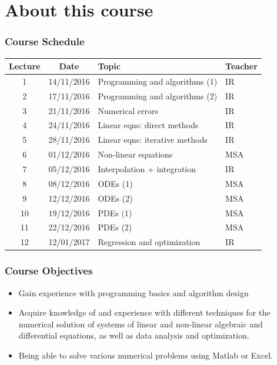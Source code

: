 \documentclass[11pt,table,final,fleqn,xcolor={usenames,dvipsnames},handout]{beamer}
\begin{document}
\section{About this course}
\begin{frame}
 \frametitle{Course Schedule}
 \begin{tabular}{ccll}
 \hline
 Lecture & Date & Topic & Teacher \\ 
 \hline
 1 & 14/11/2016 & Programming and algorithms (1) & IR \\ 
 2 & 17/11/2016 & Programming and algorithms (2) & IR \\ 
 3 & 21/11/2016 & Numerical errors & IR\\ 
 4 & 24/11/2016 & Linear eqns: direct methods& IR\\ 
 5 & 28/11/2016 & Linear eqns: iterative methods  & IR\\ 
 6 & 01/12/2016 & Non-linear equations & MSA\\ 
 7 & 05/12/2016 & Interpolation + integration & IR\\ 
 8 & 08/12/2016 & ODEs (1) & MSA\\ 
 9 & 12/12/2016 & ODEs (2) & MSA\\ 
 10 & 19/12/2016 & PDEs (1) & MSA\\ 
 11 & 22/12/2016 & PDEs (2) & MSA \\ 
 12 & 12/01/2017 & Regression and optimization& IR\\ 
 \hline
 \end{tabular} 
\end{frame}

\begin{frame}
 \frametitle{Course Objectives}
 \begin{itemize}
  \item Gain experience with programming basics and algorithm design
  \item Acquire knowledge of and experience with different techniques for the numerical solution of systems of linear and non-linear algebraic and differential equations, as well as data analysis and optimization.
  \item Being able to solve various numerical problems using Matlab or Excel. 
 \end{itemize}
\end{frame}
\end{document}
